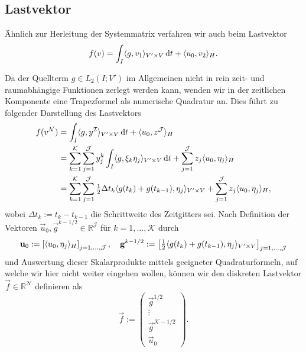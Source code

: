 \documentclass[../main.tex]{subfiles}
\begin{document}
\subsection*{Lastvektor} %

Ähnlich zur Herleitung der Systemmatrix verfahren wir auch beim Lastvektor
\begin{equation}
    f(v) = \int_{I} \langle g,v_{1}\rangle_{V' \times V} \mathop{}\!\mathrm{d} t + \langle u_{0},v_{2}\rangle_{H}.
\end{equation}

Da der Quellterm $g \in L_{2}(I; V')$ im Allgemeinen nicht in rein zeit- und raumabhängige Funktionen zerlegt werden kann, wenden wir in der zeitlichen Komponente eine Trapezformel als numerische Quadratur an.
Dies führt zu folgender Darstellung des Lastvektors
\begin{align}
    f(v^{\mathcal N})
    &= \int_{I} \langle g,y^{\mathcal I}\rangle_{V' \times V} \mathop{}\!\mathrm{d} t + \langle u_{0},z^{\mathcal J}\rangle_{H}
    \\&= \sum_{k = 1}^{\mathcal K} \sum_{j = 1}^{\mathcal J} y^{k}_{j} \int_{I} \langle g,\xi_{k} \eta_{j}\rangle_{V' \times V} \mathop{}\!\mathrm{d} t + \sum_{j = 1}^{\mathcal J} z_{j} \langle u_{0},\eta_{j}\rangle_{H}
    \\&= \sum_{k = 1}^{\mathcal K} \sum_{j = 1}^{\mathcal J} \tfrac{1}{2} \Delta t_{k} \langle g(t_{k}) + g(t_{k - 1}),\eta_{j}\rangle_{V' \times V}
         + \sum_{j = 1}^{\mathcal J} z_{j} \langle u_{0},\eta_{j}\rangle_{H},
\end{align}
wobei $\Delta t_{k} := t_{k} - t_{k - 1}$ die Schrittweite des Zeitgitters sei.
Nach Definition der Vektoren $\vec{u}_{0}, \vec{g}^{k - 1/2} \in \mathbb{R}^{\mathcal J}$ für $k = 1, \dots, \mathcal K$ durch
\begin{equation}
    \mathbf{u}_{0} := \left[ \langle u_{0},\eta_{j}\rangle_{H} \right]_{j = 1, \dots, \mathcal J },
    \quad
    \mathbf{g}^{k - 1/2} := \left[ \tfrac{1}{2} \langle g(t_{k}) + g(t_{k - 1}),\eta_{j}\rangle_{V' \times V}  \right]_{j = 1, \dots, \mathcal J}
\end{equation}
und Auswertung dieser Skalarprodukte mittels geeigneter Quadraturformeln, auf welche wir hier nicht weiter eingehen wollen, können wir den diskreten Lastvektor $\vec{f} \in \mathbb{R}^{\mathcal N}$ definieren als
\begin{equation}
    \vec{f} := \begin{pmatrix}
        \vec{g}^{1/2} \\
        \vdots\\
        \vec{g}^{\mathcal K - 1/2}\\
        \vec{u}_{0}
    \end{pmatrix}.
\end{equation}
\end{document}
